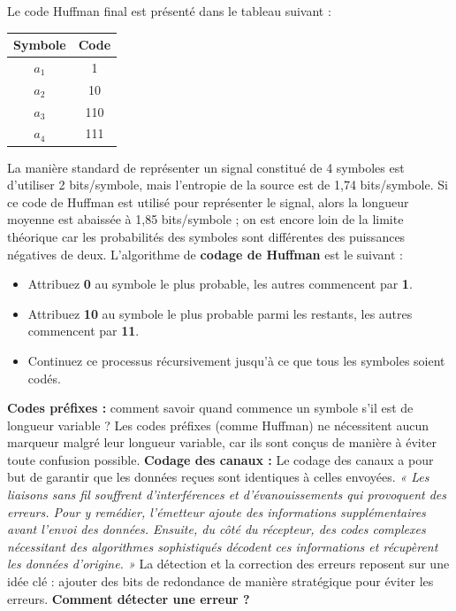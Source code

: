Le code Huffman final est présenté dans le tableau suivant :
\begin{center}
    \begin{tabular}{|c|c|}
        \hline
        \textbf{Symbole} & \textbf{Code} \\
        \hline
        $a_1$ & 1 \\
        $a_2$ & 10 \\
        $a_3$ & 110 \\
        $a_4$ & 111 \\
        \hline
    \end{tabular}
\end{center}
La manière standard de représenter un signal constitué de 4 symboles est d'utiliser 2 bits/symbole, mais l'entropie de la source est de 1,74 bits/symbole. Si ce code de Huffman est utilisé pour représenter le signal, alors la longueur moyenne est abaissée à 1,85 bits/symbole ; on est encore loin de la limite théorique car les probabilités des symboles sont différentes des puissances négatives de deux.
L'algorithme de \textbf{codage de Huffman} est le suivant :
\begin{itemize}
    \item Attribuez \textbf{0} au symbole le plus probable, les autres commencent par \textbf{1}.
    \item Attribuez \textbf{10} au symbole le plus probable parmi les restants, les autres commencent par \textbf{11}.
    \item Continuez ce processus récursivement jusqu'à ce que tous les symboles soient codés.
\end{itemize}
\textbf{Codes préfixes :} comment savoir quand commence un symbole s'il est de longueur variable ?  
Les codes préfixes (comme Huffman) ne nécessitent aucun marqueur malgré leur longueur variable, car ils sont conçus de manière à éviter toute confusion possible.
\textbf{Codage des canaux :}  
Le codage des canaux a pour but de garantir que les données reçues sont identiques à celles envoyées.  
\textit{« Les liaisons sans fil souffrent d’interférences et d’évanouissements qui provoquent des erreurs. Pour y remédier, l’émetteur ajoute des informations supplémentaires avant l’envoi des données. Ensuite, du côté du récepteur, des codes complexes nécessitant des algorithmes sophistiqués décodent ces informations et récupèrent les données d’origine. »}  
La détection et la correction des erreurs reposent sur une idée clé : ajouter des bits de redondance de manière stratégique pour éviter les erreurs.
\textbf{Comment détecter une erreur ?}  
